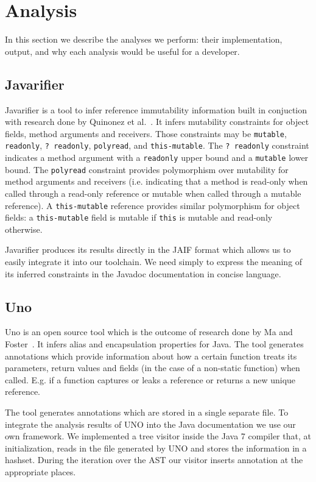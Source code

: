 \section{Analysis}

In this section we describe the analyses we perform: their implementation,
output, and why each analysis would be useful for a developer.

\subsection{Javarifier}
\label{sec:Javarifier}

Javarifier is a tool to infer reference immutability information built in
conjuction with research done by Quinonez et al.~\cite{Javarifier}. It infers
mutability constraints for object fields, method arguments and receivers. Those
constraints may be \texttt{mutable}, \texttt{readonly}, \texttt{?~readonly},
\texttt{polyread}, and \texttt{this-mutable}. The \texttt{?~readonly}
constraint indicates a method argument with a \texttt{readonly} upper bound and
a \texttt{mutable} lower bound. The \texttt{polyread} constraint provides
polymorphism over mutability for method arguments and receivers
(i.e. indicating that a method is read-only when called through a read-only
reference or mutable when called through a mutable reference). A
\texttt{this-mutable} reference provides similar polymorphism for object
fields: a \texttt{this-mutable} field is mutable if \texttt{this} is mutable
and read-only otherwise.

Javarifier produces its results directly in the JAIF format which allows us to
easily integrate it into our toolchain. We need simply to express the meaning
of its inferred constraints in the Javadoc documentation in concise language.

\subsection{Uno}

Uno is an open source tool which is the outcome of research done by Ma and
Foster~\cite{Uno}. It infers alias and encapsulation properties for Java.  The
tool generates annotations which provide information about how a certain
function treats its parameters, return values and fields (in the case of a
non-static function) when called. E.g. if a function captures or leaks a
reference or returns a new unique reference.

The tool generates annotations which are stored in a single separate file. 
To integrate the analysis results of UNO into the Java documentation we
use our own framework. We implemented a tree visitor inside the Java 7 
compiler that, at initialization, reads in the file generated by UNO and 
stores the information in a hashset. During the iteration over the AST
our visitor inserts annotation at the appropriate places.

